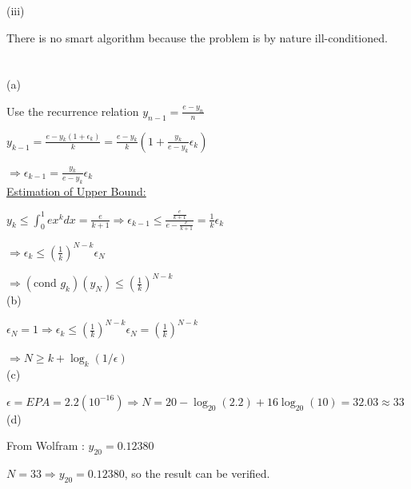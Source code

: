 \documentclass[10pt]{article}
\begin{document}
(iii)

There is no smart algorithm because the problem is by nature ill-conditioned.

\section{}

(a) 

Use the recurrence relation $y_{n-1}=\frac{e-y_n}{n}$

$y_{k-1}=\frac{e-y_k(1+\epsilon_k)}{k}=\frac{e-y_k}{k}(1+\frac{y_k}{e-y_k}\epsilon_k)$

$\Rightarrow \epsilon_{k-1}=\frac{y_k}{e-y_k}\epsilon_k$\\

\underline{Estimation of Upper Bound:}

$y_k\leq\int_{0}^{1}ex^kdx=\frac{e}{k+1}\Rightarrow \epsilon_{k-1}\leq\frac{\frac{e}{k+1}}{e-\frac{e}{k+1}}=\frac{1}{k}\epsilon_k$

$\Rightarrow \epsilon_k\leq(\frac{1}{k})^{N-k}\epsilon_N$

$\Rightarrow (\text{cond }g_k)(y_N)\leq(\frac{1}{k})^{N-k}$\\

(b)

$\epsilon_N=1\Rightarrow \epsilon_k\leq(\frac{1}{k})^{N-k}\epsilon_N=(\frac{1}{k})^{N-k}$

$\Rightarrow N\geq k+\log_k(1/\epsilon)$\\

(c)

$\epsilon=EPA=2.2(10^{-16}) \Rightarrow N=20-\log_{20}(2.2)+16\log_{20}(10)=32.03\approx 33$\\

(d)

From Wolfram : $y_{20}=0.12380$

$N=33\Rightarrow y_{20}=0.12380$, so the result can be verified.
\end{document}
